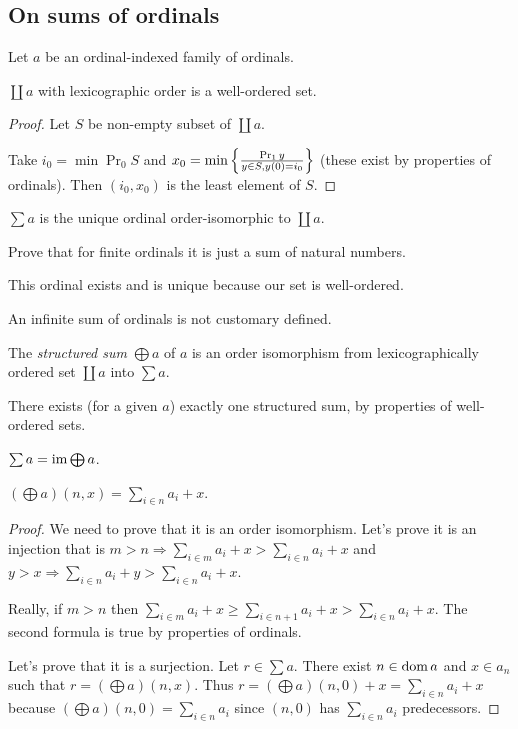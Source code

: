 \subsection{On sums of ordinals}

Let $a$ be an ordinal-indexed family of ordinals.
\begin{prop}
$\coprod a$ with lexicographic order is a well-ordered set.\end{prop}
\begin{proof}
Let $S$ be non-empty subset of $\coprod a$.

Take $i_{0}=\min\Pr_{0}S$ and $x_{0}=\min\left\{ \frac{\Pr_{1}y}{y\in S,y(0)=i_{0}}\right\}$
(these exist by properties of ordinals). Then $(i_{0},x_{0})$ is
the least element of $S$.\end{proof}
\begin{defn}
$\sum a$ is the unique ordinal order-isomorphic to $\coprod a$.\end{defn}
\begin{xca}
Prove that for finite ordinals it is just a sum of natural numbers.
\end{xca}
This ordinal exists and is unique because our set is well-ordered.
\begin{rem}
An infinite sum of ordinals is not customary defined.
\end{rem}
The \emph{structured sum} $\bigoplus a$ of
$a$ is an order isomorphism from lexicographically ordered set $\coprod a$
into $\sum a$.

There exists (for a given $a$) exactly one structured sum, by properties
of well-ordered sets.
\begin{obvious}
$\sum a=\operatorname{im}\bigoplus a$.\end{obvious}
\begin{thm}
$\left(\bigoplus a\right)(n,x)=\sum_{i\in n}a_{i}+x$.\end{thm}
\begin{proof}
We need to prove that it is an order isomorphism. Let's prove it is
an injection that is $m>n\Rightarrow\sum_{i\in m}a_{i}+x>\sum_{i\in n}a_{i}+x$
and $y>x\Rightarrow\sum_{i\in n}a_{i}+y>\sum_{i\in n}a_{i}+x$.

Really, if $m>n$ then $\sum_{i\in m}a_{i}+x\geq\sum_{i\in n+1}a_{i}+x>\sum_{i\in n}a_{i}+x$.
The second formula is true by properties of ordinals.

Let's prove that it is a surjection. Let $r\in\sum a$. There exist
$n\in\operatorname{dom} a$ and $x\in a_{n}$ such that $r=\left(\bigoplus a\right)(n,x)$.
Thus $r=\left(\bigoplus a\right)(n,0)+x=\sum_{i\in n}a_{i}+x$ because
$\left(\bigoplus a\right)(n,0)=\sum_{i\in n}a_{i}$ since $(n,0)$
has $\sum_{i\in n}a_{i}$ predecessors.
\end{proof}

